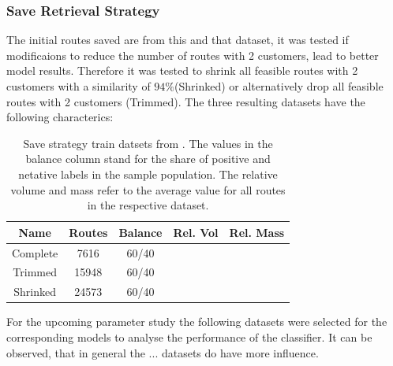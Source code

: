 \subsubsection{Save Retrieval Strategy}
The initial routes saved are from this and that dataset, it was tested if modificaions to reduce
the number of routes with 2 customers, lead to better model results. Therefore it was tested
to shrink all feasible routes with 2 customers with a similarity of $94\%$(Shrinked) or alternatively drop
all feasible routes with 2 customers (Trimmed). The three resulting datasets have the following characterics:

\begin{table}[ht]
    \centering
    \begin{tabular}{c c c c c}
        \toprule
        Name     & Routes & Balance & Rel. Vol & Rel. Mass \\
        \midrule
        Complete & 7616   & 60/40   &          &           \\
        Trimmed  & 15948  & 60/40   &          &           \\
        Shrinked & 24573  & 60/40   &          &           \\
        \bottomrule
    \end{tabular}
    \caption[Save strategy train datsets from \gendreauDataSetText.]{Save strategy train datsets from \gendreauDataSetText.
        The values in the balance column stand for the share of positive and netative labels in the sample population. The relative volume
        and mass refer to the average value for all routes in the respective dataset.}
    \label{tab:saved_instances_gendreau}
\end{table}

For the upcoming parameter study the following datasets were selected for the corresponding models
to analyse the performance of the classifier. It can be observed, that in general the ... datasets
do have more influence.


